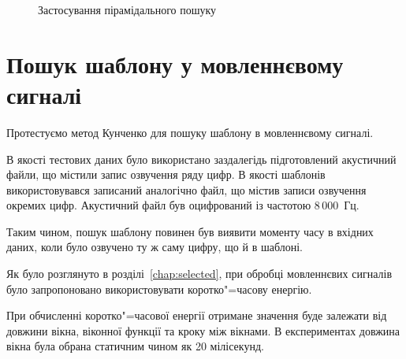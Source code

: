 \begin{figure}[h]

        \caption{Застосування пірамідального пошуку}
        \label{fig:simple-signal-kun-p}
    \end{figure}
    \clearpage

\section{Пошук шаблону у мовленнєвому сигналі}
    Протестуємо метод Кунченко для пошуку шаблону в мовленнєвому сигналі.

    В якості тестових даних було використано заздалегідь підготовлений акустичний файли, що містили запис озвучення
    ряду цифр.
    В якості шаблонів використовувався записаний аналогічно файл, що містив записи озвучення окремих цифр.
    Акустичний файл був оцифрований із частотою 8\,000~Гц.

    Таким чином, пошук шаблону повинен був виявити моменту часу в вхідних даних, коли було озвучено ту ж саму цифру,
    що й в шаблоні.

    Як було розглянуто в розділі~\ref{chap:selected}, при обробці мовленнєвих сигналів було запропоновано
    використовувати коротко"=часову енергію.

    При обчисленні коротко"=часової енергії отримане значення буде залежати від довжини вікна, віконної функції та
    кроку між вікнами.
    В експериментах довжина вікна була обрана статичним чином як 20 мілісекунд.

